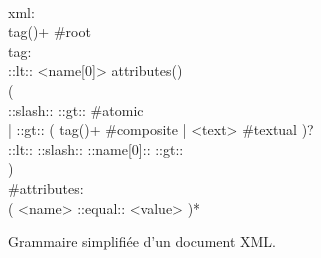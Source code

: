 \begin{figure}

\begin{bigpre}
\\
xml: \\
    tag()+ #root \\
tag: \\
    ::lt:: <name[0]> attributes() \\
    ( \\
      ::slash:: ::gt:: #atomic \\
    | ::gt:: ( tag()+ #composite | <text> #textual )? \\
      ::lt:: ::slash:: ::name[0]:: ::gt:: \\
    ) \\
#attributes: \\
    ( <name> ::equal:: <value> )*
\end{bigpre}

\caption{\label{figure:data:xml} Grammaire simplifiée d'un document XML.}

\end{figure}

